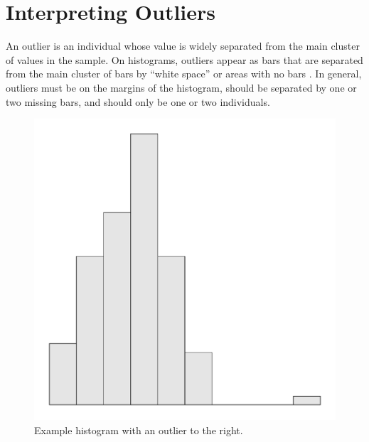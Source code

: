 \section{Interpreting Outliers}
An outlier is an individual whose value is widely separated from the main cluster of values in the sample. On histograms, outliers appear as bars that are separated from the main cluster of bars by ``white space'' or areas with no bars . In general, outliers must be on the margins of the histogram, should be separated by one or two missing bars, and should only be one or two individuals.

\begin{knitrout}
\color{fgcolor}\begin{figure}
\includegraphics[width=\maxwidth]{figure/OutlierExHist-1} \caption[Example histogram with an outlier to the right]{Example histogram with an outlier to the right.}\label{fig:OutlierExHist}
\end{figure}


\end{knitrout}


